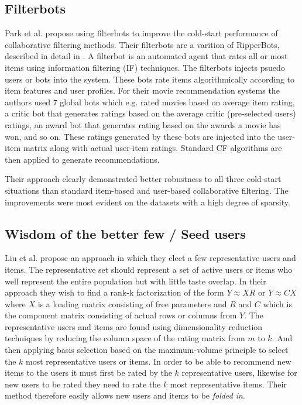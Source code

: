 \subsection{Filterbots}


Park et al. \cite{Park2006} propose using filterbots to improve the cold-start
performance of collaborative filtering methods. Their filterbots are a varition
of RipperBots, described in detail in \cite{Good1999}. A filterbot is an
automated agent that rates all or most items using information filtering (IF)
techniques. The filterbots injects psuedo users or bots into the system. These
bots rate items algorithmically according to item features and user profiles.
For their movie recommendation systems the authors used 7 global bots which
e.g. rated movies based on average item rating, a critic bot that generates ratings
based on the average critic (pre-selected users) ratings, an award bot that
generates rating based on the awards a movie has won, and so on. These ratings
generated by these bots are injected into the user-item matrix along with
actual user-item ratings. Standard CF algorithms are then applied to generate
recommendations.

Their approach clearly demonstrated better robustness to all three cold-start situations than standard item-based
and user-based collaborative filtering. The improvements were most evident on
the datasets with a high degree of sparsity.

\subsection{Wisdom of the better few / Seed users}


Liu et al. \cite{Liu2011} propose an approach in which they elect a few
representative users and items. The representative set should represent a set
of active users or items who well represent the entire population but with
little taste overlap. In their approach they wish to find a rank-k
factorization of the form $Y \approx XR$ or $Y \approx CX$ where $X$ is a
loading matrix consisting of free parameters and $R$ and $C$ which is the
component matrix consisting of actual rows or columns from $Y$. The
representative users and items are found using dimensionality reduction
techniques by reducing the column space of the rating matrix from $m$ to $k$.
And then applying basis selection based on the maximum-volume principle to
select the $k$ most representative users or items. In order to be able to
recommend new items to the users it must first be rated by the $k$
representative users, likewise for new users to be rated they need to rate the
$k$ most representative items. Their method therefore easily allows new users
and items to be \emph{folded in}.

